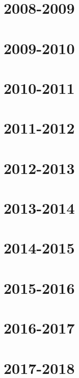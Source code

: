 \documentclass[12pt, a4paper]{article}
\begin{document}


\section{2008-2009}



\section{2009-2010}



\section{2010-2011}



\section{2011-2012}



\section{2012-2013}



\section{2013-2014}



\section{2014-2015}



\section{2015-2016}



\section{2016-2017}



\section{2017-2018}


\end{document}
